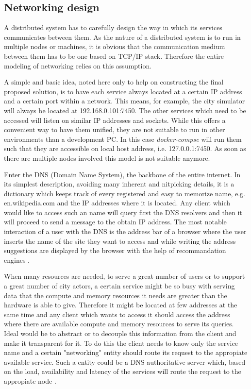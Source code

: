 \documentclass[conference]{IEEEtran}
\begin{document}
\subsection{Networking design}
\label{subsec:networking}

A distributed system has to carefully design the way in which its services communicates between them. As the nature of a distributed system is to run in multiple nodes or machines, it is obvious that the communication medium between them has to be one based on TCP/IP stack. Therefore the entire modeling of networking relies on this assumption.

A simple and basic idea, noted here only to help on constructing the final proposed solution, is to have each service always located at a certain IP address and a certain port within a network. This means, for example, the city simulator will always be located at 192.168.0.101:7450. The other services which need to be accessed will listen on similar IP addresses and sockets. While this offers a convenient way to have them unified, they are not suitable to run in other environments than a development PC. In this case \textit{docker-compse} will run them such that they are accessible on local host address, i.e. 127.0.0.1:7450. As soon as there are multiple nodes involved this model is not suitable anymore.

Enter the DNS (Domain Name System), the backbone of the entire internet. In its simplest description, avoiding many inherent and nitpicking details, it is a dictionary which keeps track of every registered and easy to memorize name, e.g. en.wikipedia.com and the IP addresses where it is located. Any client which would like to access such an name will query first the DNS resolvers and then it will proceed to send a message to the obtain IP address. The most notable interaction of a user with the DNS is the address bar of a browser where the user inserts the name of the site they want to access and while writing the address suggestions are displayed by the browser with the help of recommandation engines \citep{risley2001domain}.

When many resources are needed, to serve a great number of users or to support a great number of city actors, a certain service might be so busy with serving data that the compute and memory resources it needs are greater than the hardware is able to give. Therefore it might be located at few addresses at the same time and any client which wants to access it should access the address where there are available compute and memory resources to serve its queries. Ideal would be to abstract or to decouple this information from the client and make it transparent for it. To do this the client needs to know only the service name and a certain "networking" entity should route its request to the appropiate available service. Such a entity could be a DNS authoritative server which, based on the load, availability and latency of the services will route the request to the appropiate node \citep{swildens2006scalable}.
\end{document}

